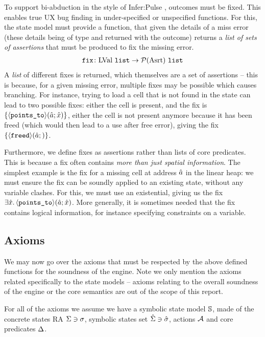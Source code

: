 To support bi-abduction in the style of Infer:Pulse \cite{pulse}, \Miss{} outcomes must be fixed. This enables true UX bug finding in under-specified or unspecified functions. For this, the state model must provide a \fix{} function, that given the details of a miss error (these details being of type \lvallist{} and returned with the outcome) returns a \emph{list of sets of assertions} that must be produced to fix the missing error.
\begin{align*}
	\texttt{fix} \colon \text{LVal}~\texttt{list} \rightarrow {\cal P}(\text{Asrt}) ~\texttt{list}
\end{align*}
A \emph{list} of different fixes is returned, which themselves are a set of assertions -- this is because, for a given missing error, multiple fixes may be possible which causes branching. For instance, trying to load a cell that is not found in the state can lead to two possible fixes: either the cell is present, and the fix is $\{ \left<\texttt{points\_to}\right>\!(\hat{a};\hat{x}) \}$, either the cell is not present anymore because it has been freed (which would then lead to a use after free error), giving the fix $\{{\left<\texttt{freed}\right>\!(\hat{a};)}\}$.

Furthermore, we define fixes as assertions rather than lists of core predicates. This is because a fix often contains \emph{more than just spatial information}. The simplest example is the fix for a missing cell at address $\hat{a}$ in the linear heap: we must ensure the fix can be soundly applied to an existing state, without any variable clashes. For this, we must use an existential, giving us the fix $\exists \hat{x}\ldotp \left<\texttt{points\_to}\right>\!(\hat{a};\hat{x})$. More generally, it is sometimes needed that the fix contains logical information, for instance specifying constraints on a variable.

\subsection{Axioms}

We may now go over the axioms that must be respected by the above defined functions for the soundness of the engine. Note we only mention the axioms related specifically to the state models -- axioms relating to the overall soundness of the engine or the core semantics are out of the scope of this report.

For all of the axioms we assume we have a symbolic state model $\mathbb S$, made of the concrete states RA $\Sigma \ni \sigma$, symbolic states set $\hat{\Sigma} \ni \hat{\sigma}$, actions ${\cal{A}}$ and core predicates $\Delta$.

